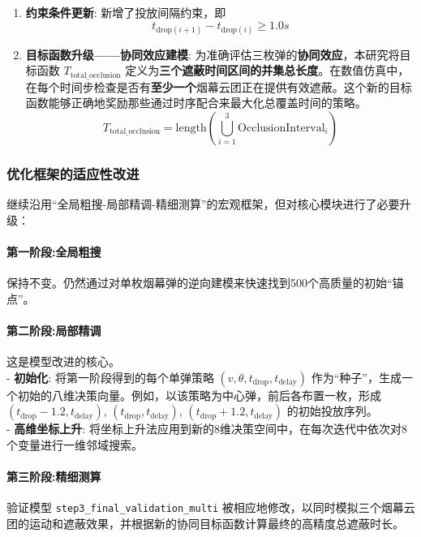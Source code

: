 \documentclass[12pt]{article}
\newcommand{\code}[1]{\texttt{#1}} %
\begin{document}
\begin{CJK}{UTF8}{gbsn}
\begin{enumerate}
			\item \textbf{约束条件更新}: 新增了投放间隔约束，即
			\begin{equation}
				t_{\text{drop}(i+1)} - t_{\text{drop}(i)} \ge 1.0 s
			\end{equation}
			
			\item \textbf{目标函数升级——协同效应建模}:
			为准确评估三枚弹的\textbf{协同效应}，本研究将目标函数 $T_{\text{total\_occlusion}}$ 定义为\textbf{三个遮蔽时间区间的并集总长度}。在数值仿真中，在每个时间步检查是否有\textbf{至少一个}烟幕云团正在提供有效遮蔽。这个新的目标函数能够正确地奖励那些通过时序配合来最大化总覆盖时间的策略。
			\begin{equation}
				T_{\text{total\_occlusion}} = \text{length} \left( \bigcup_{i=1}^{3} \text{OcclusionInterval}_i \right)
			\end{equation}
			
		\end{enumerate}
		
		\subsubsection{优化框架的适应性改进}
		继续沿用“全局粗搜-局部精调-精细测算”的宏观框架，但对核心模块进行了必要升级：
		
		\paragraph{第一阶段:全局粗搜} 保持不变。仍然通过对单枚烟幕弹的逆向建模来快速找到500个高质量的初始“锚点”。
		
		\paragraph{第二阶段:局部精调} 这是模型改进的核心。\\
		\indent - \textbf{初始化}: 将第一阶段得到的每个单弹策略 $(v, \theta, t_{\text{drop}}, t_{\text{delay}})$ 作为“种子”，生成一个初始的八维决策向量。例如，以该策略为中心弹，前后各布置一枚，形成 $(t_{\text{drop}}-1.2, t_{\text{delay}})$, $(t_{\text{drop}}, t_{\text{delay}})$, $(t_{\text{drop}}+1.2, t_{\text{delay}})$ 的初始投放序列。\\
		\indent - \textbf{高维坐标上升}: 将坐标上升法应用到新的8维决策空间中，在每次迭代中依次对8个变量进行一维邻域搜索。
		
		\paragraph{第三阶段:精细测算} 验证模型 \code{step3\_final\_validation\_multi} 被相应地修改，以同时模拟三个烟幕云团的运动和遮蔽效果，并根据新的协同目标函数计算最终的高精度总遮蔽时长。
		

\end{CJK}
\end{document}
